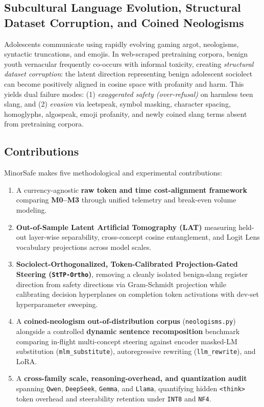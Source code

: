 \documentclass[11pt,letterpaper]{article}
\begin{document}
\subsection{Subcultural Language Evolution, Structural Dataset Corruption, and Coined Neologisms}
Adolescents communicate using rapidly evolving gaming argot, neologisms, syntactic truncations, and emojis. In web-scraped pretraining corpora, benign youth vernacular frequently co-occurs with informal toxicity, creating \textit{structural dataset corruption}: the latent direction representing benign adolescent sociolect can become positively aligned in cosine space with profanity and harm. This yields dual failure modes: (1) \textit{exaggerated safety (over-refusal)} on harmless teen slang, and (2) \textit{evasion} via leetspeak, symbol masking, character spacing, homoglyphs, algospeak, emoji profanity, and newly coined slang terms absent from pretraining corpora.

\subsection{Contributions}
MinorSafe makes five methodological and experimental contributions:
\begin{enumerate}[leftmargin=1.5em]
    \item A currency-agnostic \textbf{raw token and time cost-alignment framework} comparing \textbf{M0--M3} through unified telemetry and break-even volume modeling.
    \item \textbf{Out-of-Sample Latent Artificial Tomography (LAT)} measuring held-out layer-wise separability, cross-concept cosine entanglement, and Logit Lens vocabulary projections across model scales.
    \item \textbf{Sociolect-Orthogonalized, Token-Calibrated Projection-Gated Steering (\texttt{StTP-Ortho})}, removing a cleanly isolated benign-slang register direction from safety directions via Gram-Schmidt projection while calibrating decision hyperplanes on completion token activations with dev-set hyperparameter sweeping.
    \item A \textbf{coined-neologism out-of-distribution corpus} (\texttt{neologisms.py}) alongside a controlled \textbf{dynamic sentence recomposition} benchmark comparing in-flight multi-concept steering against encoder masked-LM substitution (\texttt{mlm\_substitute}), autoregressive rewriting (\texttt{llm\_rewrite}), and LoRA.
    \item A \textbf{cross-family scale, reasoning-overhead, and quantization audit} spanning \texttt{Qwen}, \texttt{DeepSeek}, \texttt{Gemma}, and \texttt{Llama}, quantifying hidden \texttt{<think>} token overhead and steerability retention under \texttt{INT8} and \texttt{NF4}.
\end{enumerate}
\end{document}
